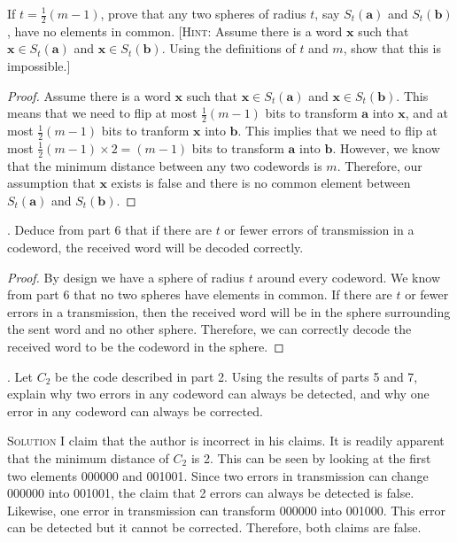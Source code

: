 \documentclass[twoside]{amsart}
\newcommand{\Solution}{\textsc{Solution}\xspace}
\begin{document}
\begin{enumerate}[A.]
      If $t=\frac{1}{2}(m-1)$, prove that any two spheres of radius $t$,
      say $S_t(\mathbf{a})$ and $S_t(\mathbf{b})$, have no elements in
      common. [\textsc{Hint}: Assume there is a word $\mathbf{x}$ such
      that $\mathbf{x} \in S_t(\mathbf{a})$ and $\mathbf{x}\in S_t(
      \mathbf{b})$. Using the definitions of $t$ and $m$, show that
      this is impossible.]

      \begin{proof}
         Assume there is a word $\mathbf{x}$ such that $\mathbf{x} \in
         S_t(\mathbf{a})$ and $\mathbf{x}\in S_t( \mathbf{b})$. 
	 This means that we need to flip at most $\frac{1}{2}(m-1)$ bits
	 to transform $\mathbf{a}$ into $\mathbf{x}$, and at most
	 $\frac{1}{2}(m-1)$ bits to tranform $\mathbf{x}$ into $\mathbf{b}$.
	 This implies that we need to flip at most 
	 $\frac{1}{2}(m-1) \times 2 = (m-1)$ bits to transform
	 $\mathbf{a}$ into $\mathbf{b}$. However, we know that the 
	 minimum distance between any two codewords is $m$. Therefore,
	 our assumption that $\mathbf{x}$ exists is false and there is
	 no common element between $S_t(\mathbf{a})$ and $S_t(\mathbf{b})$.
      \end{proof}

      . Deduce from part 6 that if there are $t$ or fewer errors
      of transmission in a codeword, the received word will be decoded 
      correctly.

      \begin{proof}
      By design we have a sphere of radius $t$ around every codeword.
      We know from part 6 that no two spheres have elements in common.
      If there are $t$ or fewer errors in a transmission, then the
      received word will be in the sphere surrounding the sent word and
      no other sphere. Therefore, we can correctly decode the received
      word to be the codeword in the sphere.
      \end{proof}

      . Let $C_2$ be the code described in part 2. Using the
      results of parts 5 and 7, explain why two errors in any codeword
      can always be detected, and why one error in any
      codeword can always be corrected.

      \noindent \Solution I claim that the author is incorrect in his claims.
      It is readily apparent that the minimum distance of $C_2$ is 2. This
      can be seen by looking at the first two elements 000000 and 001001.
      Since two errors in transmission can change 000000 into 001001, the claim
      that 2 errors can always be detected is false. Likewise, one error
      in transmission can transform 000000 into 001000. This error can
      be detected but it cannot be corrected. Therefore, both claims are
      false.


\end{enumerate}
\end{document}
